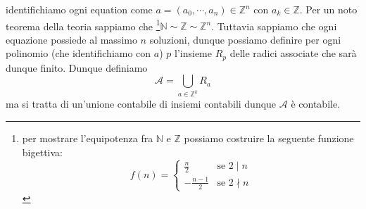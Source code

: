 \documentclass{report}
\begin{document}
\begin{mysolution}
	identifichiamo ogni equation come $a = (a_0, \cdots , a_n) \in \mathbb{Z}^n$ con $a_k \in \mathbb{Z}$. Per un noto teorema della teoria sappiamo che \footnote{per mostrare l'equipotenza fra $\mathbb{N}$ e $\mathbb{Z}$ possiamo costruire la seguente funzione bigettiva: \begin{equation*}
	f(n) = \begin{cases} \frac{n}{2} & \text{se } 2 \mid n \\ -\frac{n-1}{2} & \text{se } 2 \nmid n \end{cases}	
\end{equation*}
}$\mathbb{N} \sim \mathbb{Z} \sim \mathbb{Z}^n$. Tuttavia sappiamo che ogni equazione possiede al massimo $n$ soluzioni, dunque possiamo definire per ogni polinomio (che identifichiamo con $a$) $p$ l'insieme $R_p$ delle radici associate che sarà dunque finito. Dunque definiamo $$\mathcal{A} = \bigcup_{a \in \mathbb{Z}^k} R_a$$ ma si tratta di un'unione contabile di insiemi contabili dunque $\mathcal{A}$ è contabile.
\end{mysolution}
\end{document}
